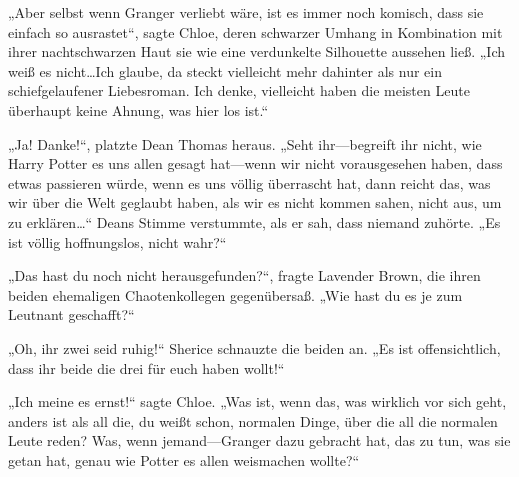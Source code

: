 „Aber selbst wenn Granger verliebt wäre, ist es immer noch komisch, dass sie einfach so ausrastet“, sagte Chloe, deren schwarzer Umhang in Kombination mit ihrer nachtschwarzen Haut sie wie eine verdunkelte Silhouette aussehen ließ. „Ich weiß es nicht…Ich glaube, da steckt vielleicht mehr dahinter als nur ein schiefgelaufener Liebesroman. Ich denke, vielleicht haben die meisten Leute überhaupt keine Ahnung, was hier los ist.“

„Ja! Danke!“, platzte Dean Thomas heraus. „Seht ihr—begreift ihr nicht, wie Harry Potter es uns allen gesagt hat—wenn wir nicht vorausgesehen haben, dass etwas passieren würde, wenn es uns völlig überrascht hat, dann reicht das, was wir über die Welt geglaubt haben, als wir es nicht kommen sahen, nicht aus, um zu erklären…“ Deans Stimme verstummte, als er sah, dass niemand zuhörte. „Es ist völlig hoffnungslos, nicht wahr?“

„Das hast du noch nicht herausgefunden?“, fragte Lavender Brown, die ihren beiden ehemaligen Chaotenkollegen gegenübersaß. „Wie hast du es je zum Leutnant geschafft?“

„Oh, ihr zwei seid ruhig!“ Sherice schnauzte die beiden an. „Es ist offensichtlich, dass ihr beide die drei für euch haben wollt!“

„Ich meine es ernst!“ sagte Chloe. „Was ist, wenn das, was wirklich vor sich geht, anders ist als all die, du weißt schon, normalen Dinge, über die all die normalen Leute reden? Was, wenn jemand—Granger dazu gebracht hat, das zu tun, was sie getan hat, genau wie Potter es allen weismachen wollte?“

